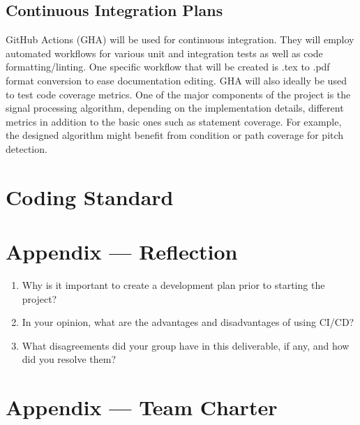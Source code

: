 \documentclass{article}
\begin{document}
\subsection{Continuous Integration Plans}
GitHub Actions (GHA) will be used for continuous integration. They will employ automated workflows for various unit and integration tests
as well as code formatting/linting. One specific workflow that will be created is .tex to .pdf format conversion to ease documentation editing.
GHA will also ideally be used to test code coverage metrics. One of the major components of the project is the signal processing algorithm, 
depending on the implementation details, different metrics in addition to the basic ones such as statement coverage. For example, the designed algorithm 
might benefit from condition or path coverage for pitch detection.

\section{Coding Standard}


\newpage{}

\section*{Appendix --- Reflection}




\begin{enumerate}
    \item Why is it important to create a development plan prior to starting the
    project?
    \item In your opinion, what are the advantages and disadvantages of using
    CI/CD?
    \item What disagreements did your group have in this deliverable, if any,
    and how did you resolve them?
\end{enumerate}

\newpage{}

\section*{Appendix --- Team Charter}

\end{document}

